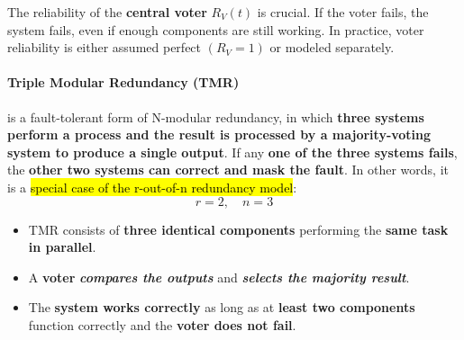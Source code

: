 \noindent
The reliability of the \textbf{central voter} $R_{V}(t)$ is crucial. If the voter fails, the system fails, even if enough components are still working. In practice, voter reliability is either assumed perfect $\left(R_{V} = 1\right)$ or modeled separately.

\newpage

\paragraph{Triple Modular Redundancy (TMR)}

 is a fault-tolerant form of N-modular redundancy, in which \textbf{three systems perform a process and the result is processed by a majority-voting system to produce a single output}. If any \textbf{one of the three systems fails}, the \textbf{other two systems can correct and mask the fault}. In other words, it is a \hl{special case of the r-out-of-n redundancy model}:
\begin{equation*}
    r = 2, \quad n = 3
\end{equation*}
\begin{itemize}
    \item TMR consists of \textbf{three identical components} performing the \textbf{same task in parallel}.
    \item A \textbf{voter} \emph{\textbf{compares the outputs}} and \emph{\textbf{selects the majority result}}.
    \item The \textbf{system works correctly} as long as at \textbf{least two components} function correctly and the \textbf{voter does not fail}.
\end{itemize}

